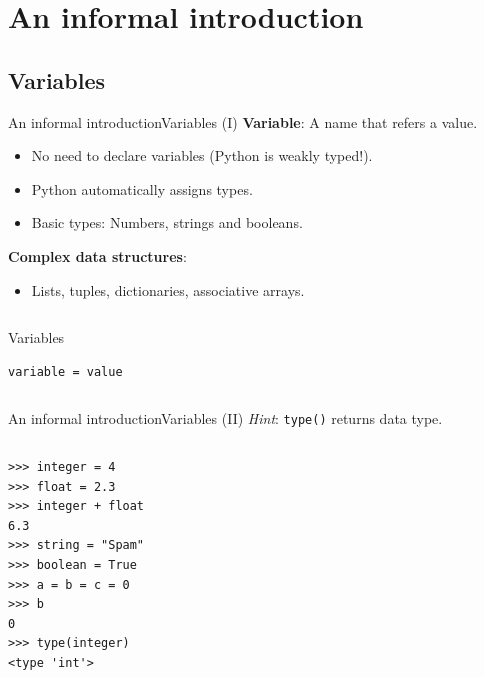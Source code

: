 \documentclass[10pt,compress]{beamer} %
\begin{document}
\section{An informal introduction}

\subsection{Variables}
\begin{frame}[fragile]{An informal introduction}{Variables (I)}
 	\textbf{Variable}: A name that refers a value.
	\begin{itemize}
		\item No need to declare variables (Python is weakly typed!).
		\item Python automatically assigns types.
		\item Basic types: Numbers, strings and booleans.
	\end{itemize}
	\textbf{Complex data structures}:
		\begin{itemize}
		\item Lists, tuples, dictionaries, associative arrays.
		\end{itemize}

    \begin{columns}
	\begin{block}{Variables}
	\begin{verbatim}
variable = value
\end{verbatim}
	\end{block}
	\end{columns}
\end{frame}

\begin{frame}[fragile]{An informal introduction}{Variables (II)}
	\centering \textit{Hint}: \texttt{type()} returns data type.

   	\begin{columns}
		\begin{block}{}
		\begin{verbatim}
>>> integer = 4
>>> float = 2.3
>>> integer + float
6.3
>>> string = "Spam"
>>> boolean = True
>>> a = b = c = 0
>>> b
0
>>> type(integer)
<type 'int'>
\end{verbatim}
		\end{block}
	\end{columns}
\end{frame}
\end{document}
